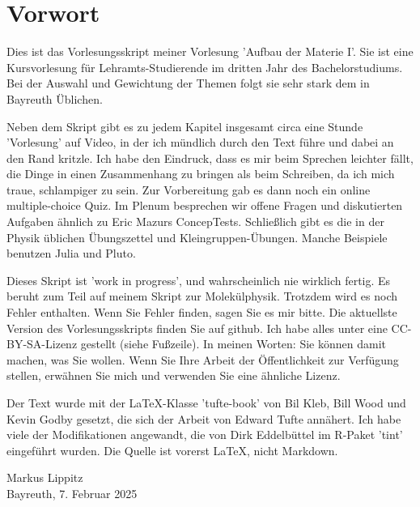 \renewcommand{\lastmod}{\ \ }
\renewcommand{\chapterauthors}{\ \ }

\chapter*{Vorwort}

Dies ist das Vorlesungsskript meiner Vorlesung 'Aufbau der Materie I'. Sie ist eine Kursvorlesung für  Lehramts-Studierende im dritten Jahr des Bachelorstudiums. Bei der Auswahl und Gewichtung der Themen folgt sie sehr stark dem in Bayreuth Üblichen. 

Neben dem Skript gibt es zu jedem Kapitel  insgesamt circa eine Stunde 'Vorlesung' auf Video, in der ich mündlich durch den Text führe und dabei an den Rand kritzle.
Ich habe den Eindruck, dass es mir beim Sprechen leichter fällt, die Dinge in einen Zusammenhang zu bringen als beim Schreiben, da ich mich traue, schlampiger zu sein. Zur Vorbereitung gab es dann noch ein online multiple-choice Quiz.  Im Plenum  besprechen wir offene Fragen und diskutierten Aufgaben ähnlich zu Eric Mazurs 
ConcepTests.  Schließlich gibt es die in der Physik üblichen Übungszettel und Kleingruppen-Übungen. Manche  Beispiele benutzen Julia  und Pluto. 



Dieses Skript ist 'work in progress', und wahrscheinlich nie wirklich fertig. Es beruht zum Teil auf meinem Skript zur Molekülphysik. Trotzdem wird es noch Fehler enthalten. Wenn Sie Fehler finden, sagen Sie es mir bitte. 
Die aktuellste Version des Vorlesungsskripts finden Sie auf github.  Ich habe alles unter eine CC-BY-SA-Lizenz gestellt (siehe Fußzeile). In meinen Worten: Sie können damit machen, was Sie wollen. Wenn Sie Ihre Arbeit der Öffentlichkeit zur Verfügung stellen, erwähnen Sie mich und verwenden Sie eine ähnliche Lizenz. 


Der Text wurde mit der LaTeX-Klasse 'tufte-book' von Bil Kleb, Bill Wood und Kevin Godby gesetzt, die sich der Arbeit von Edward Tufte annähert. Ich habe viele der Modifikationen angewandt, die von Dirk Eddelbüttel im R-Paket 'tint' eingeführt wurden. Die Quelle ist vorerst LaTeX, nicht Markdown.




\vspace{2\baselineskip}

Markus Lippitz \\ Bayreuth, 7. Februar 2025

 
 



